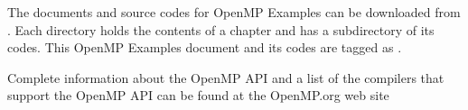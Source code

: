 The documents and source codes for OpenMP Examples can be downloaded from
\href{\examplesrepo}{\examplesrepo}.
Each directory holds the contents of a chapter and has a  subdirectory of its codes. 
This OpenMP Examples \VER{} document and its codes are tagged as  
.

Complete information about the OpenMP API and a list of the compilers that support
the OpenMP API can be found at the OpenMP.org web site


\clearpage




